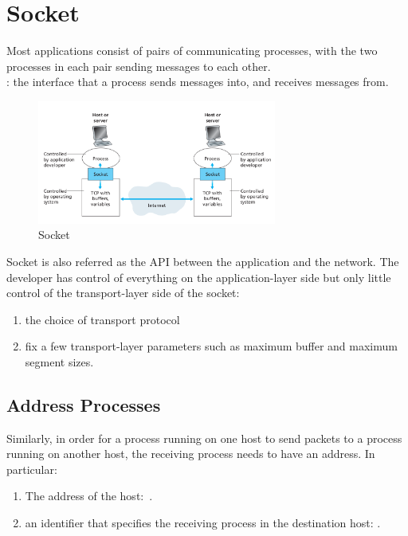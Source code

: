 \section{Socket}

\hf
Most applications consist of pairs of communicating processes, with the two processes in each pair sending messages to each other.\\
: the interface that a process sends messages into, and receives messages from.

\begin{figure}[!h]
    \centering
    \includegraphics[width=0.7\textwidth]{chapters/chapter2/socket.png}
    \caption{Socket}
    \label{c2_socket}
\end{figure}

Socket is also referred as the API between the application and the network. The developer has control
of everything on the application-layer side but only little control of the transport-layer side of the socket:
\begin{enumerate}
    \item the choice of transport protocol
    \item fix a few transport-layer parameters such as maximum buffer and maximum segment sizes.
\end{enumerate}

\subsection{Address Processes}

\hf
Similarly, in order for a process running on one host to send packets to a
process running on another host, the receiving process needs to have an address.
In particular:
\begin{enumerate}
    \item The address of the host:\ .
    \item an identifier that specifies the receiving process in the destination host: .
\end{enumerate}


